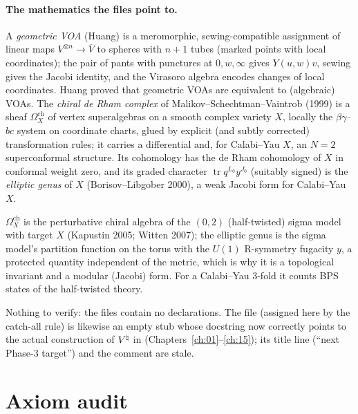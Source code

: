\paragraph{The mathematics the files point to.} A \emph{geometric VOA} (Huang) is a meromorphic, sewing-compatible
assignment of linear maps $V^{\otimes n}\to\overline V$ to spheres with $n+1$ tubes (marked points with local
coordinates); the pair of pants with punctures at $0,w,\infty$ gives $Y(u,w)v$, sewing gives the Jacobi identity, and
the Virasoro algebra encodes changes of local coordinates. Huang proved that geometric VOAs are equivalent to
(algebraic) VOAs. The \emph{chiral de Rham complex} of Malikov--Schechtman--Vaintrob (1999) is a sheaf
$\Omega^{\mathrm{ch}}_X$ of vertex superalgebras on a smooth complex variety $X$, locally the $\beta\gamma$--$bc$ system on
coordinate charts, glued by explicit (and subtly corrected) transformation rules; it carries a differential and, for
Calabi--Yau $X$, an $N=2$ superconformal structure. Its cohomology has the de Rham cohomology of $X$ in conformal
weight zero, and its graded character $\operatorname{tr}q^{L_0}y^{J_0}$ (suitably signed) is the \emph{elliptic genus}
of $X$ (Borisov--Libgober 2000), a weak Jacobi form for Calabi--Yau $X$.

\begin{physics}
$\Omega^{\mathrm{ch}}_X$ is the perturbative chiral algebra of the $(0,2)$ (half-twisted) sigma model with target $X$
(Kapustin 2005; Witten 2007); the elliptic genus is the sigma model's partition function on the torus with the
$U(1)$ R-symmetry fugacity $y$, a protected quantity independent of the metric, which is why it is a topological
invariant and a modular (Jacobi) form. For a Calabi--Yau 3-fold it counts BPS states of the half-twisted theory.
\end{physics}

\begin{status}
Nothing to verify: the files contain no declarations. The file 
(assigned here by the catch-all rule) is likewise an empty stub whose docstring now correctly points to the actual
construction of ${V^{\natural}}$ in  (Chapters~\ref{ch:01}--\ref{ch:15}); its title line
(``next Phase-3 target'') and the comment  are stale.
\end{status}

\section{Axiom audit}\label{l19:sec:axioms}

